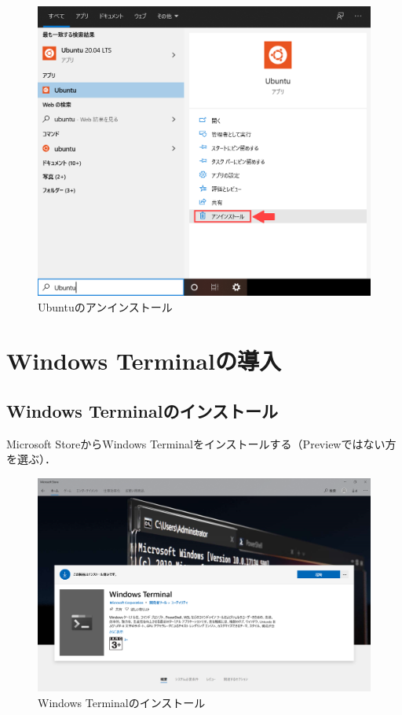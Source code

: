 \documentclass[uplatex]{jsarticle}
\begin{document}
\begin{figure}[h]
\centering
\includegraphics[scale=0.45]{./図/uninstall.png}
\caption{Ubuntuのアンインストール}
\end{figure}

\newpage

\section{Windows Terminalの導入}
\subsection{Windows Terminalのインストール}
Microsoft StoreからWindows Terminalをインストールする（Previewではない方を選ぶ）．

\begin{figure}[h]
\centering
\includegraphics[scale=0.3]{./図/install_terminal.png}
\caption{Windows Terminalのインストール}
\end{figure}
\end{document}

